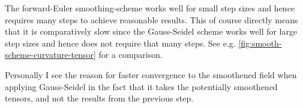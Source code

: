 \documentclass[a4paper,10pt,notitlepage]{scrreprt}
\begin{document}
The forward-Euler smoothing-scheme works well for small step sizes and hence
requires many steps to achieve reasonable results. This of course directly
means that it is comparatively slow since the Gauss-Seidel scheme works well
for large step sizes and hence does not require that many steps. See e.g.
\ref{fig:smooth-scheme-curvature-tensor} for a comparison.

Personally I see the reason for faster convergence to the smoothened field
when applying Gauss-Seidel in the fact that it takes the potentially
smoothened tensors, and not the results from the previous step.

\begin{figure}
\end{figure}
\end{document}

